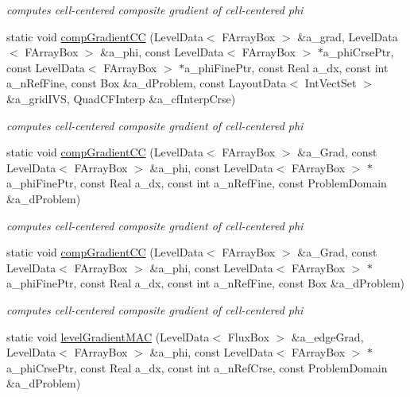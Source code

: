 \begin{DoxyCompactItemize}
\begin{DoxyCompactList}\small\item\em computes cell-\/centered composite gradient of cell-\/centered phi \end{DoxyCompactList}\item 
static void \hyperlink{class_gradient_a4f44d7eef3d2b675d9c67c90b9904747}{comp\-Gradient\-C\-C} (Level\-Data$<$ F\-Array\-Box $>$ \&a\-\_\-grad, Level\-Data$<$ F\-Array\-Box $>$ \&a\-\_\-phi, const Level\-Data$<$ F\-Array\-Box $>$ $\ast$a\-\_\-phi\-Crse\-Ptr, const Level\-Data$<$ F\-Array\-Box $>$ $\ast$a\-\_\-phi\-Fine\-Ptr, const Real a\-\_\-dx, const int a\-\_\-n\-Ref\-Fine, const Box \&a\-\_\-d\-Problem, const Layout\-Data$<$ Int\-Vect\-Set $>$ \&a\-\_\-grid\-I\-V\-S, Quad\-C\-F\-Interp \&a\-\_\-cf\-Interp\-Crse)
\begin{DoxyCompactList}\small\item\em computes cell-\/centered composite gradient of cell-\/centered phi \end{DoxyCompactList}\item 
static void \hyperlink{class_gradient_a23967a97f57bc4c1609e63faa2eaf437}{comp\-Gradient\-C\-C} (Level\-Data$<$ F\-Array\-Box $>$ \&a\-\_\-\-Grad, const Level\-Data$<$ F\-Array\-Box $>$ \&a\-\_\-phi, const Level\-Data$<$ F\-Array\-Box $>$ $\ast$a\-\_\-phi\-Fine\-Ptr, const Real a\-\_\-dx, const int a\-\_\-n\-Ref\-Fine, const Problem\-Domain \&a\-\_\-d\-Problem)
\begin{DoxyCompactList}\small\item\em computes cell-\/centered composite gradient of cell-\/centered phi \end{DoxyCompactList}\item 
static void \hyperlink{class_gradient_ad59fcf73da0f075761f2363b1d1e6c2b}{comp\-Gradient\-C\-C} (Level\-Data$<$ F\-Array\-Box $>$ \&a\-\_\-\-Grad, const Level\-Data$<$ F\-Array\-Box $>$ \&a\-\_\-phi, const Level\-Data$<$ F\-Array\-Box $>$ $\ast$a\-\_\-phi\-Fine\-Ptr, const Real a\-\_\-dx, const int a\-\_\-n\-Ref\-Fine, const Box \&a\-\_\-d\-Problem)
\begin{DoxyCompactList}\small\item\em computes cell-\/centered composite gradient of cell-\/centered phi \end{DoxyCompactList}\item 
static void \hyperlink{class_gradient_a7d6a189f7e14c864e35ef507128c9113}{level\-Gradient\-M\-A\-C} (Level\-Data$<$ Flux\-Box $>$ \&a\-\_\-edge\-Grad, Level\-Data$<$ F\-Array\-Box $>$ \&a\-\_\-phi, const Level\-Data$<$ F\-Array\-Box $>$ $\ast$a\-\_\-phi\-Crse\-Ptr, const Real a\-\_\-dx, const int a\-\_\-n\-Ref\-Crse, const Problem\-Domain \&a\-\_\-d\-Problem)

\end{DoxyCompactItemize}
